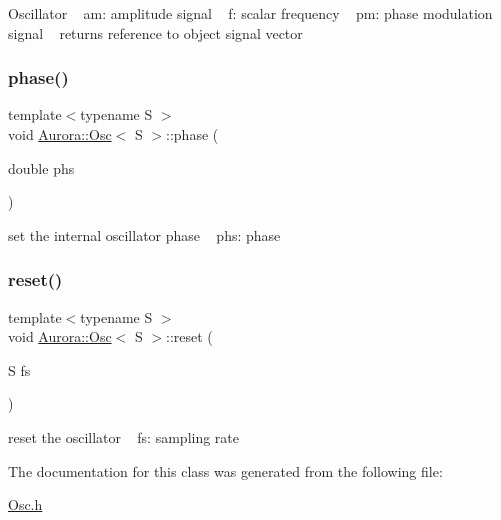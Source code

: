 Oscillator ~\newline
am\+: amplitude signal ~\newline
f\+: scalar frequency ~\newline
pm\+: phase modulation signal ~\newline
returns reference to object signal vector \mbox{\label{class_aurora_1_1_osc_a5828ab7fc7bddc7d8f4e349844f220b3}} 
\subsubsection{\texorpdfstring{phase()}{phase()}}
{\footnotesize\ttfamily template$<$typename S $>$ \\
void \hyperlink{class_aurora_1_1_osc}{Aurora\+::\+Osc}$<$ S $>$\+::phase (\begin{DoxyParamCaption}\item[{double}]{phs }\end{DoxyParamCaption})\hspace{0.3cm}{\ttfamily [inline]}}

set the internal oscillator phase ~\newline
phs\+: phase \mbox{\label{class_aurora_1_1_osc_a74abc44400ec00c9ff1dad13cdb24000}} 
\subsubsection{\texorpdfstring{reset()}{reset()}}
{\footnotesize\ttfamily template$<$typename S $>$ \\
void \hyperlink{class_aurora_1_1_osc}{Aurora\+::\+Osc}$<$ S $>$\+::reset (\begin{DoxyParamCaption}\item[{S}]{fs }\end{DoxyParamCaption})\hspace{0.3cm}{\ttfamily [inline]}}

reset the oscillator ~\newline
fs\+: sampling rate 

The documentation for this class was generated from the following file\+:\begin{DoxyCompactItemize}
\item 
\hyperlink{_osc_8h}{Osc.\+h}\end{DoxyCompactItemize}
